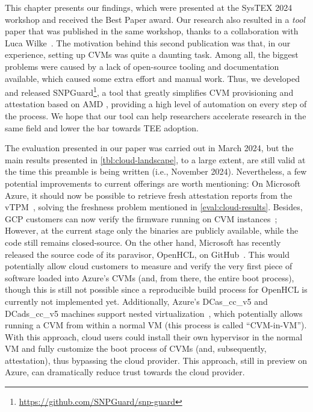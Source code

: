 This chapter presents our findings, which were presented at the SysTEX 2024
workshop and received the Best Paper award. Our research also resulted in a
\emph{tool} paper that was published in the same workshop, thanks to a
collaboration with Luca Wilke~\cite{wilke2024snpguard}. The motivation behind
this second publication was that, in our experience, setting up \acp{CVM} was
quite a daunting task. Among all, the biggest problems were caused by a lack of
open-source tooling and documentation available, which caused some extra effort
and manual work. Thus, we developed and released
SNPGuard\footnote{\url{https://github.com/SNPGuard/snp-guard}}, a tool that
greatly simplifies \ac{CVM} provisioning and attestation based on AMD
\sevsnpshort{}, providing a high level of automation on every step of the
process. We hope that our tool can help researchers accelerate research in the
same field and lower the bar towards \acs{TEE} adoption.

The evaluation presented in our paper was carried out in March 2024, but the
main results presented in \cref{tbl:cloud-landscape}, to a large extent, are
still valid at the time this preamble is being written (i.e., November 2024).
Nevertheless, a few potential improvements to current offerings are worth
mentioning: On Microsoft Azure, it should now be possible to retrieve fresh
\sevsnpshort{} attestation reports from the
\acs{vTPM}~\cite{azurevTPMfreshness}, solving the freshness problem mentioned in
\cref{eval:cloud-results}. Besides, \ac{GCP} customers can now verify the
firmware running on \ac{CVM} instances~\cite{googleVerifyFirmware}; However, at
the current stage only the binaries are publicly available, while the code still
remains closed-source. On the other hand, Microsoft has recently released the
source code of its paravisor, OpenHCL, on GitHub~\cite{openHclGithub}. This
would potentially allow cloud customers to measure and verify the very first
piece of software loaded into Azure's \acp{CVM} (and, from there, the entire
boot process), though this is still not possible since a reproducible build
process for OpenHCL is currently not implemented yet. Additionally, Azure's
DCas\_cc\_v5 and DCads\_cc\_v5 machines support nested
virtualization~\cite{azureDocsNestedVirtualization}, which potentially allows
running a \sevsnpshort{} \ac{CVM} from within a normal \acs{VM} (this process is
called ``CVM-in-VM''). With this approach, cloud users could install their own
hypervisor in the normal \acs{VM} and fully customize the boot process of
\acp{CVM} (and, subsequently, attestation), thus bypassing the cloud provider.
This approach, still in preview on Azure, can dramatically reduce trust towards
the cloud provider.